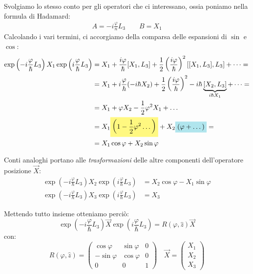 \documentclass[../../FisicaTeorica.tex]{subfiles}
\begin{document}
Svolgiamo lo stesso conto per gli operatori che ci interessano, ossia poniamo nella formula di Hadamard:
\begin{align*}
A = -i\frac{\varphi}{n}L_3\qquad B = X_1
\end{align*}
Calcolando i vari termini, ci accorgiamo della comparsa delle espansioni di $\sin$ e $\cos$:
\begin{align*}
\exp\left( -i\frac{\varphi}{\hbar}L_3 \right) X_1 \exp\left(i\frac{\varphi}{\hbar}L_3 \right) &= X_1 + \frac{i\varphi}{\hbar}[X_1, L_3]+ \frac{1}{2}\left(\frac{i\varphi}{\hbar}\right)^2 [[X_1, L_3], L_3] + \dots =\\
&= X_1 + i\frac{\varphi}{\hbar}(-i\hbar X_2)+\frac{1}{2}\left(\frac{i\varphi}{\hbar}\right)^2 -i\hbar \underbrace{[X_2,L_3]}_{i\hbar X_1}+\dots=\\
&=X_1 + \varphi X_2 - \frac{1}{2}\varphi^2 X_1 + \dots \\
&= X_1\hlc{Yellow}{\left(1-\frac{1}{2}\varphi^2 \dots\right)} + X_2\hlc{SkyBlue}{(\varphi + \dots)} =\\
&= X_1 \cos\varphi + X_2 \sin\varphi
\end{align*} %

Conti analoghi portano alle \textit{trasformazioni} delle altre componenti dell'operatore posizione $\vec{X}$:
\begin{align*}
\exp\left(-i\frac{\varphi}{\hbar}L_3\right) X_2 \exp\left(i\frac{\varphi}{\hbar} L_3 \right)&=X_2 \cos\varphi-X_1\sin\varphi\\
\exp\left(-i\frac{\varphi}{\hbar}L_3\right) X_3 \exp\left(i\frac{\varphi}{\hbar}L_3\right)&= X_3
\end{align*}

Mettendo tutto insieme otteniamo perciò:
\[
\exp\left(-i\frac{\varphi}{\hbar}L_3\right) \vec{X} \exp\left(i\frac{\varphi}{\hbar}L_3 \right) = R(\varphi, \hat{z}) \vec{X}
\]
con:
\[
R(\varphi, \hat{z}) = \begin{pmatrix}
\cos\varphi & \sin\varphi & 0\\
-\sin\varphi & \cos\varphi & 0\\
0 & 0 & 1
\end{pmatrix}\quad
\vec{X}=\begin{pmatrix} X_1 \\ X_2 \\ X_3 \end{pmatrix}
\]
\end{document}
